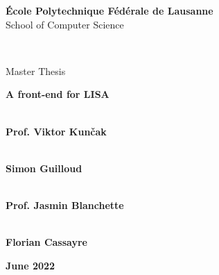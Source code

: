 \begin{center}
{\LARGE \textbf{École Polytechnique Fédérale de Lausanne}} \\
\vspace{0.2cm}
{\Large {School of Computer Science}} \\
\vspace{1cm}

 \\
\vspace{0.8cm}

{\Large {Master Thesis}} \\
\vspace{1cm}

{\LARGE \textbf{A front-end for LISA}} \\
\vspace{1cm}

\end{center}

\begin{multicols}{2}
 \\
\large{\textbf{Prof. Viktor Kunčak}} \\
\vspace{0.1cm}

 \\
\large{\textbf{Simon Guilloud}} \\
\vspace{0.1cm}

 \\
\large{\textbf{Prof. Jasmin Blanchette}} \\
\vspace{0.1cm}
\columnbreak

 \\
\large{\textbf{Florian Cassayre}} \\
\end{multicols}

\vspace{2cm}

\begin{center}
  \large{\textbf{June 2022}}
\end{center}
